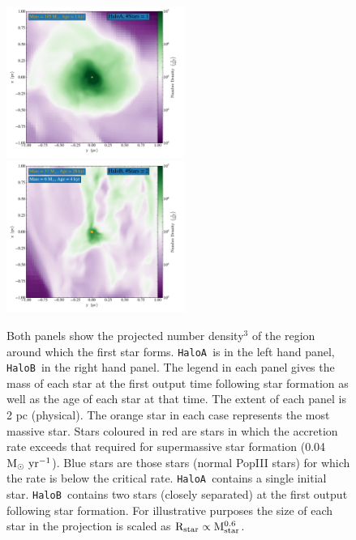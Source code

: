 \documentclass[graphics, twocolumn, usenatbib]{mn2e}
\newcommand{\msolaryrc} {$\rm{M_{\odot}~yr^{-1}}$}
\newcommand{\ha} {\texttt{HaloA~}}
\newcommand{\hb} {\texttt{HaloB~}}
\begin{document}
\begin{figure} 
\centering
\begin{minipage}{175mm}      \begin{center} 
\centerline{
\includegraphics[width=0.52\textwidth]{FIGURES/HaloA/Proj_z_number_density_0001.pdf}
\includegraphics[width=0.52\textwidth]{FIGURES/HaloB/Proj_z_number_density_0028.pdf}}
\caption{Both panels show the projected number density$^3$ of the region around which the first
  star forms. \ha is in the left hand panel, \hb in the right hand panel.
  The legend in each panel gives the mass of each star at the first output time following star
  formation as well as the age of each star at that time. The extent of each panel is 2 pc (physical). The orange
  star in each case represents the most massive star. Stars coloured in red are stars in which the accretion rate
  exceeds that required for supermassive star formation (0.04 \msolaryrc). Blue stars are those stars
  (normal PopIII stars) for
  which the rate is below the critical rate. \ha contains a single initial star. \hb contains two stars (closely separated)
  at the first output following star formation. For illustrative purposes the size of each star in the
projection is scaled as $\rm{R_{star}} \propto \rm{M_{star}^{0.6}}$.}\label{Fig:ProjectionStart}
\end{center} \end{minipage}

\end{figure}
\end{document}
